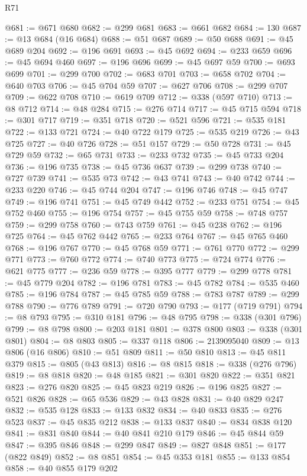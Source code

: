 \begin{lexlean}{R71}
\begin{coremodule}
@681 := @671 @680
@682 := @299 @681
@683 := @661 @682
@684 := 130
@687 := @13 @684 (@16 @684)
@688 := @51 @687
@689 := @50 @688
@691 := @45 @689 @204
@692 := @196 @691
@693 := @45 @692
@694 := @233 @659
@696 := @45 @694 @460
@697 := @196 @696
@699 := @45 @697 @59
@700 := @693 @699
@701 := @299 @700
@702 := @683 @701
@703 := @658 @702
@704 := @640 @703
@706 := @45 @704 @59
@707 := @627 @706
@708 := @299 @707
@709 := @622 @708
@710 := @619 @709
@712 := @338 (@597 @710)
@713 := @8 @712
@714 := @48 @284
@715 := @276 @714
@717 := @45 @715 @594
@718 := @301 @717
@719 := @351 @718
@720 := @521 @596
@721 := @535 @181
@722 := @133 @721
@724 := @40 @722 @179
@725 := @535 @219
@726 := @43 @725
@727 := @40 @726
@728 := @51 @157
@729 := @50 @728
@731 := @45 @729 @59
@732 := @65 @731
@733 := @233 @732
@735 := @45 @733 @204
@736 := @196 @735
@738 := @45 @736 @637
@739 := @299 @738
@740 := @727 @739
@741 := @535 @73
@742 := @43 @741
@743 := @40 @742
@744 := @233 @220
@746 := @45 @744 @204
@747 := @196 @746
@748 := @45 @747
@749 := @196 @741
@751 := @45 @749 @442
@752 := @233 @751
@754 := @45 @752 @460
@755 := @196 @754
@757 := @45 @755 @59
@758 := @748 @757
@759 := @299 @758
@760 := @743 @759
@761 := @45 @238
@762 := @196 @725
@764 := @45 @762 @442
@765 := @233 @764
@767 := @45 @765 @460
@768 := @196 @767
@770 := @45 @768 @59
@771 := @761 @770
@772 := @299 @771
@773 := @760 @772
@774 := @740 @773
@775 := @724 @774
@776 := @621 @775
@777 := @236 @59
@778 := @395 @777
@779 := @299 @778
@781 := @45 @779 @204
@782 := @196 @781
@783 := @45 @782
@784 := @535 @460
@785 := @196 @784
@787 := @45 @785 @59
@788 := @783 @787
@789 := @299 @788
@790 := @776 @789
@791 := @720 @790
@793 := @177 (@719 @791)
@794 := @8 @793
@795 := @310 @181
@796 := @48 @795
@798 := @338 (@301 @796)
@799 := @8 @798
@800 := @203 @181
@801 := @378 @800
@803 := @338 (@301 @801)
@804 := @8 @803
@805 := @337 @118
@806 := 2139095040
@809 := @13 @806 (@16 @806)
@810 := @51 @809
@811 := @50 @810
@813 := @45 @811 @379
@815 := @805 (@43 @813)
@816 := @8 @815
@818 := @338 (@276 @796)
@819 := @8 @818
@820 := @48 @185
@821 := @301 @820
@822 := @351 @821
@823 := @276 @820
@825 := @45 @823 @219
@826 := @196 @825
@827 := @521 @826
@828 := @65 @536
@829 := @43 @828
@831 := @40 @829 @247
@832 := @535 @128
@833 := @133 @832
@834 := @40 @833
@835 := @276 @523
@837 := @45 @835 @212
@838 := @133 @837
@840 := @834 @838 @120
@841 := @831 @840
@844 := @40 @841 @210 @179
@846 := @45 @844 @59
@847 := @395 @846
@848 := @299 @847
@849 := @827 @848
@851 := @177 (@822 @849)
@852 := @8 @851
@854 := @45 @353 @181
@855 := @133 @854
@858 := @40 @855 @179 @202

\end{coremodule}
\end{lexlean}
